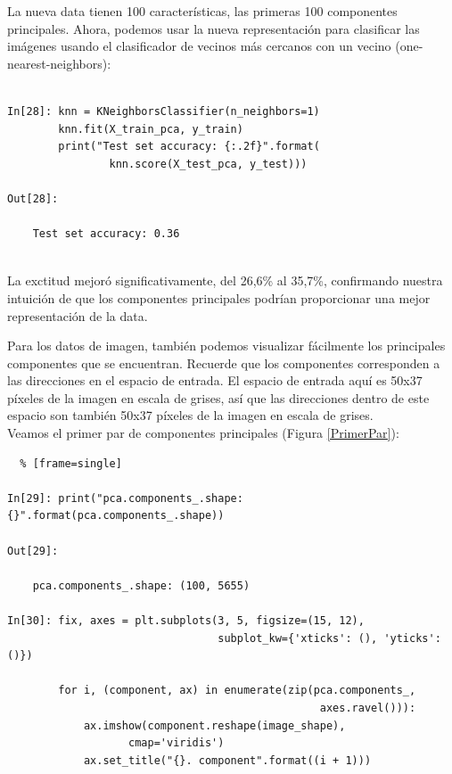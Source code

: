 La nueva  data tienen 100 características, las primeras 100 componentes principales. Ahora, podemos usar la nueva representación para clasificar las imágenes usando el clasificador de vecinos más cercanos con un vecino (one-nearest-neighbors):

\begin{lstlisting}  	

In[28]: knn = KNeighborsClassifier(n_neighbors=1)
        knn.fit(X_train_pca, y_train)
        print("Test set accuracy: {:.2f}".format(
                knn.score(X_test_pca, y_test)))

Out[28]:

    Test set accuracy: 0.36


\end{lstlisting} 



La exctitud  mejoró  significativamente, del  26,6\%   al   35,7\%,   confirmando nuestra intuición de que los componentes principales podrían proporcionar una mejor representación de la data.


Para los datos de imagen, también podemos visualizar fácilmente los principales componentes que se encuentran. Recuerde que los componentes corresponden a las direcciones en el espacio de entrada. El espacio de entrada aquí  es 50x37  píxeles de la imagen  en  escala de grises, así que las direcciones dentro de este espacio son también 50x37  píxeles de la imagen  en  escala de grises.\\

 Veamos el  primer par de componentes principales (Figura \ref{PrimerPar}):\\



\begin{lstlisting}  % [frame=single]	

In[29]: print("pca.components_.shape: {}".format(pca.components_.shape))

Out[29]:
    
    pca.components_.shape: (100, 5655)

In[30]: fix, axes = plt.subplots(3, 5, figsize=(15, 12),
                                 subplot_kw={'xticks': (), 'yticks': ()})

        for i, (component, ax) in enumerate(zip(pca.components_, 
                                                 axes.ravel())):
            ax.imshow(component.reshape(image_shape),
                   cmap='viridis')
            ax.set_title("{}. component".format((i + 1)))

\end{lstlisting} 



